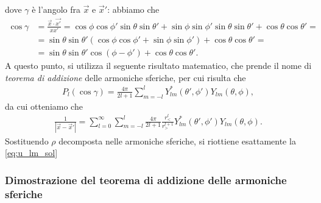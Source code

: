 dove $\gamma$ è l'angolo fra $\vec{x}$ e $\vec{x}'$: abbiamo che
\begin{align}
	\cos{\gamma} &= \frac{\vec{x} \cdot \vec{x'}}{x x'} = \cos{\phi} \cos{\phi'} \sin{\theta}\sin{\theta'} + \sin{\phi} \sin{\phi'} \sin{\theta} \sin{\theta'} + \cos{\theta} \cos{\theta'} = \nonumber \\
	&=\sin{\theta} \sin{\theta'}(\cos{\phi} \cos{\phi'} + \sin{\phi} \sin{\phi'}) + \cos{\theta} \cos{\theta'} = \nonumber \\
	&=\sin{\theta} \sin{\theta'} \cos{(\phi - \phi')} + \cos{\theta} \cos{\theta'}.
\end{align}
A questo punto, si utilizza il seguente risultato matematico, che prende il nome di \emph{teorema di addizione} delle armoniche sferiche, per cui risulta che
\begin{align}
	P_l(\cos{\gamma}) = \frac{4 \pi}{2l+1} \sum_{m=-l}^l Y_{lm}^*(\theta', \phi') Y_{lm}(\theta, \phi),
\end{align}
da cui otteniamo che
\begin{align}
	\frac{1}{|\vec{x}-\vec{x}'|} = \sum_{l=0}^{\infty} \sum_{m=-l}^l \frac{4\pi}{2l+1} \frac{r_<^l}{r_>^{l+1}} Y^*_{lm}(\theta', \phi') Y_{lm}(\theta, \phi).
\end{align}
Sostituendo $\rho$ decomposta nelle armoniche sferiche, si riottiene esattamente la \eqref{eq:u_lm_sol}
\subsubsection{Dimostrazione del teorema di addizione delle armoniche sferiche}

